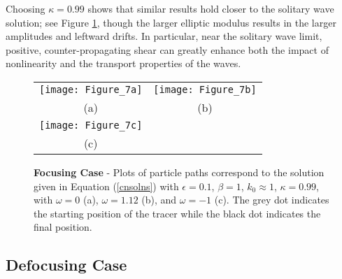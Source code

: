 \documentclass{JFM_Style/jfm}
\begin{document}
Choosing $\kappa=0.99$ shows that similar results hold closer to the solitary wave solution; see Figure \ref{fig:foc_kap_pt99}, though the larger elliptic modulus results in the larger amplitudes and leftward drifts.  In particular, near the solitary wave limit, positive, counter-propagating shear can greatly enhance both the impact of nonlinearity and the transport properties of the waves.
\begin{figure}
\centering
\begin{tabular}{cc}
\texttt{[image: Figure\_7a]} & \texttt{[image: Figure\_7b]} \\
(a) & (b) \\
\texttt{[image: Figure\_7c]} & \\
(c) &
\end{tabular}
\caption{\small {\bf Focusing Case} - Plots of particle paths correspond to the solution given in Equation (\ref{cnsolns}) with $\epsilon=0.1$, $\beta=1$, $k_{0}\approx 1$, $\kappa=0.99$, with $\omega=0$ (a), $\omega=1.12$ (b), and $\omega=-1$ (c). The grey dot indicates the starting position of the tracer while the black dot indicates the final position.}
\label{fig:foc_kap_pt99}
\end{figure}

\subsection{Defocusing Case}
\end{document}
